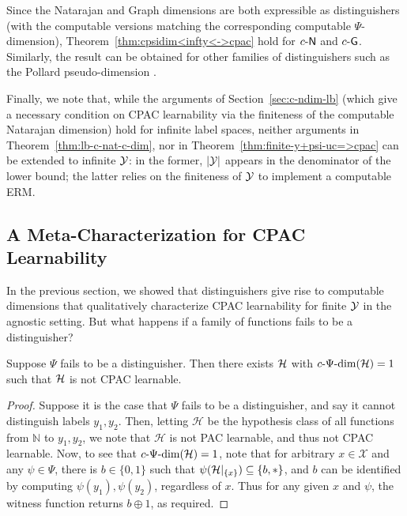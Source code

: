 \documentclass[11pt]{article}
\begin{document}
\begin{remark}
    Since the Natarajan and Graph dimensions are both expressible as distinguishers (with the computable versions matching the corresponding computable $\Psi$-dimension), Theorem~\ref{thm:cpsidim<infty<->cpac} hold for $c\text{-}\mathsf{N}$ and $c\text{-}\mathsf{G}$.
    Similarly, the result can be obtained for other  families of distinguishers such as the Pollard pseudo-dimension \citep{pollard1990empirical,haussler1992decision}.
\end{remark}

Finally, we note that, while the arguments of Section~\ref{sec:c-ndim-lb} (which give a necessary condition on CPAC learnability via the finiteness of the computable Natarajan dimension) hold for infinite label spaces, neither arguments in Theorem~\ref{thm:lb-c-nat-c-dim}, nor in Theorem~\ref{thm:finite-y+psi-uc=>cpac} can be extended to infinite $\mathcal{Y}$: in the former, $|\mathcal{Y}| $ appears in the denominator of the lower bound; the latter relies on the finiteness of $\mathcal{Y}$ to implement a computable ERM.

\subsection{A Meta-Characterization for CPAC Learnability}

In the previous section, we showed that distinguishers give rise to computable dimensions that qualitatively characterize CPAC learnability for finite $\mathcal{Y}$ in the agnostic setting.
But what happens if a family of functions fails to be a distinguisher?

\begin{proposition}
\label{prop:not-distinguisher}
    Suppose $\Psi$ fails to be a distinguisher. 
    Then there exists $\mathcal{H}$ with $c\text{-}\Psi\text{-}\mathrm{dim}(\mathcal{H})=1$ such that $\mathcal{H}$ is not CPAC learnable.
\end{proposition}

\begin{proof}
    Suppose it is the case that $\Psi$ fails to be a distinguisher, and say it cannot distinguish labels $y_1,y_2$. 
    Then,  letting $\mathcal{H}$ be the hypothesis class of all functions from $\mathbb{N}$ to $y_1,y_2$, we note that $\mathcal{H}$ is not PAC learnable, and thus not CPAC learnable. 
    Now, to see that $c\text{-}\Psi\text{-}\mathrm{dim}(\mathcal{H})=1$, note that for arbitrary $x\in\mathcal{X}$ and any $\psi\in\Psi$, there is $b\in\{0,1\}$ such that  $\psi(\mathcal{H}|_{\{x\}})\subseteq\{b,*\}$, and $b$ can be identified by computing $\psi(y_1), \psi(y_2)$, regardless of $x$. 
    Thus for any given $x$ and $\psi$, the witness function returns $b\oplus1$, as required. 
\end{proof}
\end{document}

